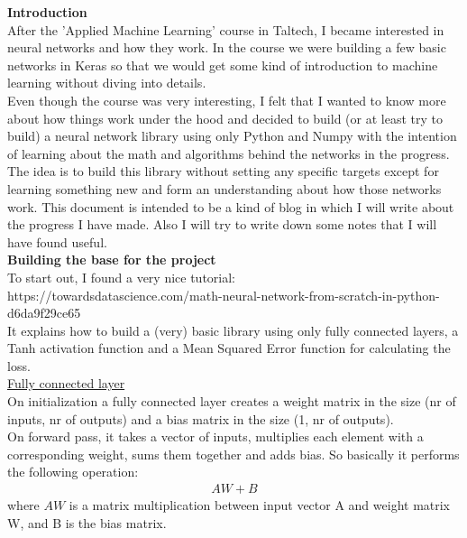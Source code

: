 \documentclass{article}
\begin{document}
\textbf{Introduction} \\

After the 'Applied Machine Learning' course in Taltech, I became interested in
neural networks and how they work. In the course we were building a few basic networks 
in Keras so that we would get some kind of introduction to machine learning without 
diving into details.\\

Even though the course was very interesting, I felt that I wanted to know more about 
how things work under the hood and decided to build (or at least try to build) a neural network library
using only Python and Numpy with the intention of learning about the math and algorithms behind the networks in the
progress.\\

The idea is to build this library without setting any specific targets except for learning
something new and form an understanding about how those networks work. This document is intended 
to be a kind of blog in which I will write about the progress I have made. Also I will try 
to write down some notes that I will have found useful. \\

\textbf{Building the base for the project} \\

To start out, I found a very nice tutorial:\\
https://towardsdatascience.com/math-neural-network-from-scratch-in-python-d6da9f29ce65 \\

It explains how to build a (very) basic library using only fully connected
layers, a Tanh activation function and a Mean Squared Error function 
for calculating the loss. \\

\underline{Fully connected layer} \\
On initialization a fully connected layer creates a weight matrix in the size (nr of inputs, nr of outputs) and 
a bias matrix in the size (1, nr of outputs). \\
On forward pass, it takes a vector of inputs, multiplies each element with a corresponding weight, 
sums them together and adds bias. So basically it performs the following operation:
\begin{align*}
    AW + B
\end{align*}
where $AW$ is a matrix multiplication between input vector A and weight matrix W, and B is the bias matrix. \\
\end{document}
